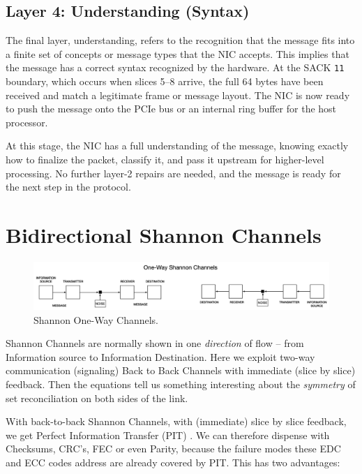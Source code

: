 \documentclass[../../../OAE-SPEC-MAIN.tex]{subfiles}
\begin{document}
\subsection{Layer 4: Understanding (Syntax)}

The final layer, understanding, refers to the recognition that the message fits into a finite set of concepts or message types that the NIC accepts. This implies that the message has a correct syntax recognized by the hardware. At the SACK \texttt{11} boundary, which occurs when slices 5–8 arrive, the full 64 bytes have been received and match a legitimate frame or message layout. The NIC is now ready to push the message onto the PCIe bus or an internal ring buffer for the host processor.

At this stage, the NIC has a full understanding of the message, knowing exactly how to finalize the packet, classify it, and pass it upstream for higher-level processing. No further layer-2 repairs are needed, and the message is ready for the next step in the protocol.

\section{Bidirectional Shannon Channels}

\begin{figure}
\includegraphics[width=\textwidth]{FIGURES/One-Way-Shannon.png}
  \caption{Shannon One-Way Channels. }
\end{figure}

Shannon Channels are normally shown in one \emph{direction} of flow -- from Information source to Information Destination. Here we exploit two-way communication (signaling) Back to Back Channels with immediate (slice by slice) feedback. Then the equations tell us something interesting about the \emph{symmetry} of set reconciliation on both sides of the link.

With back-to-back Shannon Channels, with (immediate) slice by slice feedback, we get Perfect Information Transfer (PIT) \cite{soltted-aloha}. We can therefore dispense with Checksums, CRC's, FEC or even Parity,  because the failure modes these EDC and ECC codes address are already covered by PIT.  This has two advantages:
\end{document}
